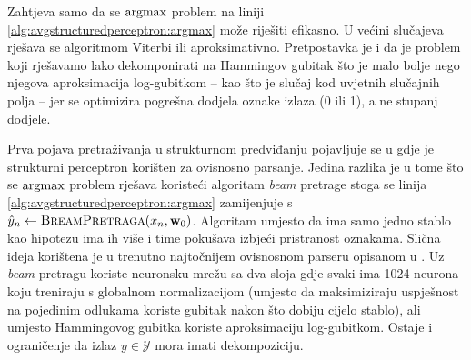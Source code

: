 Zahtjeva samo da se $\operatorname*{argmax}$ problem na liniji
\ref{alg:avgstructuredperceptron:argmax} može riješiti efikasno. U većini
slučajeva rješava se algoritmom Viterbi ili aproksimativno. Pretpostavka je i da
je problem koji rješavamo lako dekomponirati na Hammingov gubitak što je malo
bolje nego njegova aproksimacija log-gubitkom -- kao što je slučaj kod uvjetnih
slučajnih polja -- jer se optimizira pogrešna dodjela oznake izlaza (0 ili 1), a
ne stupanj dodjele.

Prva pojava pretraživanja u strukturnom predviđanju pojavljuje se u
\citep{collins2004incremental} gdje je strukturni perceptron korišten za
ovisnosno parsanje. Jedina razlika je u tome što se $\operatorname*{argmax}$ problem rješava
koristeći algoritam \textit{beam} pretrage stoga se linija
\ref{alg:avgstructuredperceptron:argmax} zamijenjuje s $\hat{y}_n \gets
\textsc{BreamPretraga}(x_n, \mathbf{w}_0)$. Algoritam umjesto da ima samo jedno
stablo kao hipotezu ima ih više i time pokušava izbjeći pristranost oznakama.
Slična ideja korištena je u trenutno najtočnijem ovisnosnom parseru opisanom u
\citep{andor2016globally}. Uz \textit{beam} pretragu koriste neuronsku mrežu sa
dva sloja gdje svaki ima 1024 neurona koju treniraju s globalnom normalizacijom
(umjesto da maksimiziraju uspješnost na pojedinim odlukama koriste gubitak nakon
što dobiju cijelo stablo), ali umjesto Hammingovog gubitka koriste aproksimaciju
log-gubitkom. Ostaje i ograničenje da izlaz $y \in \mathcal{Y}$ mora imati
dekompoziciju.
